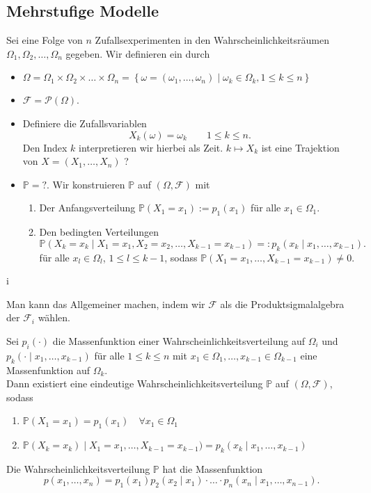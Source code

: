 \subsection{Mehrstufige Modelle}
Sei eine Folge von $n$ Zufallsexperimenten in den Wahrscheinlichkeitsräumen  $\Omega_1,\Omega_2,\ldots,\Omega_n$ gegeben. Wir definieren ein  durch
\begin{itemize}
    \item $\Omega = \Omega_1\times \Omega_2\times \ldots\times \Omega_n = \left \{\omega=(\omega_1,\ldots,\omega_n) \mid  \omega_k \in \Omega_k, 1\leq k\leq n\right\} $ 
    \item $\mathcal{F} = \mathcal{P}(\Omega)$.
    \item Definiere die Zufallsvariablen
        \[
            X_k(\omega) = \omega_k \qquad 1\leq k\leq n
        .\] 
        Den Index $k$ interpretieren wir hierbei als Zeit.  $k \mapsto  X_k$ ist eine Trajektion von $X = (X_1,\ldots,X_n)$ ?
    \item $\mathbb{P}=?$. Wir konstruieren $\mathbb{P}$ auf $(\Omega,\mathcal{F})$ mit
        \begin{enumerate}[label=\protect\circled{\alph*}]
            \item Der Anfangsverteilung $\mathbb{P}(X_1=x_1) := p_1(x_1)$ für alle $x_1\in \Omega_1$.
            \item Den bedingten Verteilungen
                 \[
                     \mathbb{P}(X_k = x_k \mid  X_1 = x_1, X_2 = x_2, \ldots, X_{k-1} = x_{k-1}) =: p_k(x_k\mid x_1,\ldots,x_{k-1})
                .\] 
                für alle $x_l\in \Omega_l$, $1\leq l\leq k-1$, sodass $\mathbb{P}(X_1=x_1,\ldots,X_{k-1}=x_{k-1})\neq 0$.
        \end{enumerate}
\end{itemize}i
\begin{remark*}
    Man kann das Allgemeiner machen, indem wir $\mathcal{F}$ als die Produktsigmalalgebra der $\mathcal{F}_i$ wählen.
\end{remark*}
\begin{theorem}\label{thm:stufenmodell}
    Sei $p_i(\cdot )$ die Massenfunktion einer Wahrscheinlichkeitsverteilung auf $\Omega_i$ und $p_k(\cdot \mid x_1,\ldots,x_{k-1})$ für alle $1\leq k\leq n$ mit $x_1\in \Omega_1, \ldots,x_{k-1} \in \Omega_{k-1}$ eine Massenfunktion auf $\Omega_k$. \\
    Dann existiert eine eindeutige Wahrscheinlichkeitsverteilung $\mathbb{P}$ auf $(\Omega,\mathcal{F})$, sodass
    \begin{enumerate}[label=\protect\circled{\alph*}]
        \item $\mathbb{P}(X_1=x_1) = p_1(x_1) \quad \forall x_1\in \Omega_1$
        \item $\mathbb{P}(X_k = x_k) \mid  X_1 = x_1,\ldots,X_{k-1}=x_{k-1}) = p_k(x_k \mid  x_1,\ldots,x_{k-1})$
    \end{enumerate}
    Die Wahrscheinlichkeitsverteilung $\mathbb{P}$ hat die Massenfunktion
    \[
        p(x_1,\ldots,x_n) = p_1(x_1) p_2(x_2\mid x_1) \cdot \ldots\cdot p_n(x_n \mid x_1,\ldots, x_{n-1})
    .\] 
\end{theorem}
